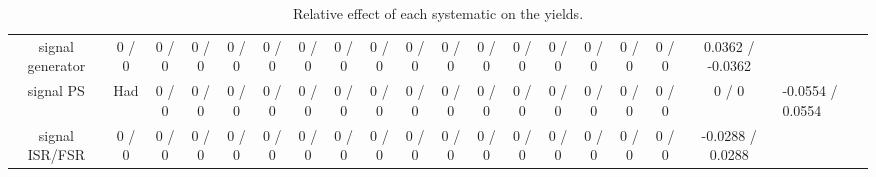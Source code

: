\documentclass[10pt]{article}
\begin{document}
\begin{table}[htbp]
\begin{center}
\begin{tabular}{|c|c|c|c|c|c|c|c|c|c|c|c|c|c|c|c|c|c|}
  signal generator & 0 / 0 & 0 / 0 & 0 / 0 & 0 / 0 & 0 / 0 & 0 / 0 & 0 / 0 & 0 / 0 & 0 / 0 & 0 / 0 & 0 / 0 & 0 / 0 & 0 / 0 & 0 / 0 & 0 / 0 & 0 / 0 & 0.0362 / -0.0362 \\ 
  signal PS & Had & 0 / 0 & 0 / 0 & 0 / 0 & 0 / 0 & 0 / 0 & 0 / 0 & 0 / 0 & 0 / 0 & 0 / 0 & 0 / 0 & 0 / 0 & 0 / 0 & 0 / 0 & 0 / 0 & 0 / 0 & 0 / 0 & -0.0554 / 0.0554 \\ 
  signal ISR/FSR & 0 / 0 & 0 / 0 & 0 / 0 & 0 / 0 & 0 / 0 & 0 / 0 & 0 / 0 & 0 / 0 & 0 / 0 & 0 / 0 & 0 / 0 & 0 / 0 & 0 / 0 & 0 / 0 & 0 / 0 & 0 / 0 & -0.0288 / 0.0288 \\ 
\hline 
\end{tabular} 
\caption{Relative effect of each systematic on the yields.} 
\end{center} 
\end{table} 
\end{document}
